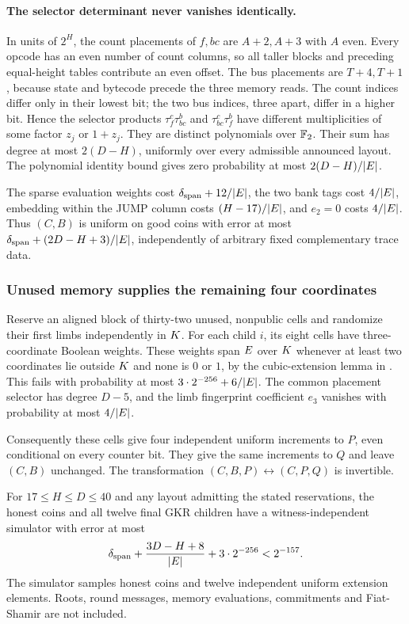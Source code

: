 \paragraph{The selector determinant never vanishes identically.} In units of $2^H$, the count placements of $f,bc$ are $A+2,A+3$ with $A$ even. Every opcode has an even number of count columns, so all taller blocks and preceding equal-height tables contribute an even offset. The bus placements are $T+4,T+1$, because state and bytecode precede the three memory reads. The count indices differ only in their lowest bit; the two bus indices, three apart, differ in a higher bit. Hence the selector products $\tau^c_f\tau^b_{bc}$ and $\tau^c_{bc}\tau^b_f$ have different multiplicities of some factor $z_j$ or $1+z_j$. They are distinct polynomials over $\mathbb{F}_2$. Their sum has degree at most $2(D-H)$, uniformly over every admissible announced layout. The polynomial identity bound gives zero probability at most $2(D-H)/|E|$.

The sparse evaluation weights cost $\delta_{\mathrm{span}}+12/|E|$, the two bank tags cost $4/|E|$, embedding within the JUMP column costs $(H-17)/|E|$, and $e_2=0$ costs $4/|E|$. Thus $(C,B)$ is uniform on good coins with error at most $\delta_{\mathrm{span}}+(2D-H+3)/|E|$, independently of arbitrary fixed complementary trace data.

\subsubsection{Unused memory supplies the remaining four coordinates}

Reserve an aligned block of thirty-two unused, nonpublic cells and randomize their first limbs independently in $K$. For each child $i$, its eight cells have three-coordinate Boolean weights. These weights span $E$ over $K$ whenever at least two coordinates lie outside $K$ and none is $0$ or $1$, by the cubic-extension lemma in . This fails with probability at most $3\cdot2^{-256}+6/|E|$. The common placement selector has degree $D-5$, and the limb fingerprint coefficient $e_3$ vanishes with probability at most $4/|E|$.

Consequently these cells give four independent uniform increments to $P$, even conditional on every counter bit. They give the same increments to $Q$ and leave $(C,B)$ unchanged. The transformation $(C,B,P)\leftrightarrow(C,P,Q)$ is invertible.

\begin{theorem}
For $17\le H\le D\le40$ and any layout admitting the stated reservations, the honest coins and all twelve final GKR children have a witness-independent simulator with error at most
\[
 \delta_{\mathrm{span}}+\frac{3D-H+8}{|E|}+3\cdot2^{-256}<2^{-157}.
\]
The simulator samples honest coins and twelve independent uniform extension elements. Roots, round messages, memory evaluations, commitments and Fiat-Shamir are not included.
\end{theorem}

